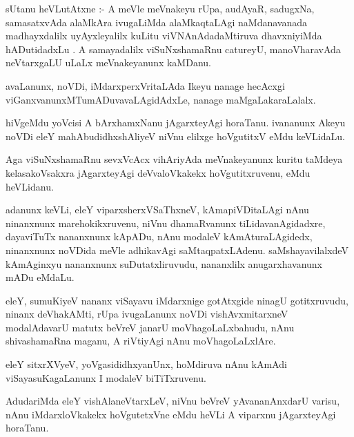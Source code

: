 \documentclass{article}
\begin{document}
\begin{mn}
sUtanu heVLutAtxne :- A meVle meVnakeyu rUpa, audAyaR, sadugxNa, 
samasatxvAda alaMkAra ivugaLiMda alaMkaqtaLAgi naMdanavanada madhayxdalilx 
uyAyxleyalilx kuLitu viVNAnAdadaMtiruva dhavxniyiMda hADutidadxLu	.
 A samayadalilx viSuNxshamaRnu catureyU, manoVharavAda neVtarxgaLU uLaLx meVnakeyanunx kaMDanu.
\end{mn}

\begin{mn}
avaLanunx, noVDi, iMdarxperxVritaLAda Ikeyu nanage hecAcxgi 
viGanxvanunxMTumADuvavaLAgidAdxLe, nanage maMgaLakaraLalalx.
\end{mn}

\begin{mn}
hiVgeMdu yoVcisi A bArxhamxNanu jAgarxteyAgi horaTanu. ivananunx 
Akeyu noVDi eleY mahAbudidhxshAliyeV niVnu elilxge hoVgutitxV	 eMdu keVLidaLu.
\end{mn}

\begin{mn}
Aga viSuNxshamaRnu sevxVcAcx vihAriyAda meVnakeyanunx kuritu taMdeya 
kelasakoVsakxra jAgarxteyAgi deVvaloVkakekx hoVgutitxruvenu, eMdu heVLidanu.
\end{mn}

\begin{mn}
adanunx keVLi, eleY viparxsherxVSaThxneV, kAmapiVDitaLAgi nAnu ninanxnunx
marehokikxruvenu, niVnu dhamaRvanunx tiLidavanAgidadxre, dayaviTuTx 
nananxnunx kApADu, nAnu modaleV kAmAturaLAgidedx, ninanxnunx noVDida 
meVle adhikavAgi saMtaqpatxLAdenu.  saMshayavilalxdeV kAmAginxyu
nananxnunx suDutatxliruvudu,  nananxlilx anugarxhavanunx mADu eMdaLu.
\end{mn}

\begin{mn}
eleY, sumuKiyeV nananx viSayavu  iMdarxnige gotAtxgide ninagU gotitxruvudu,
ninanx deVhakAMti, rUpa ivugaLanunx noVDi vishAvxmitarxneV modalAdavarU
matutx beVreV janarU moVhagoLaLxbahudu, nAnu shivashamaRna maganu, 
A riVtiyAgi nAnu moVhagoLaLxlAre.
\end{mn}

\begin{mn}
eleY sitxrXVyeV, yoVgasididhxyanUnx, hoMdiruva nAnu kAmAdi viSayasuKagaLanunx
I modaleV biTiTxruvenu.
\end{mn}

\begin{mn}
AdudariMda eleY vishAlaneVtarxLeV, niVnu beVreV yAvananAnxdarU varisu,
 nAnu iMdarxloVkakekx hoVgutetxVne eMdu heVLi A viparxnu jAgarxteyAgi horaTanu.
\end{mn}
\end{document}
